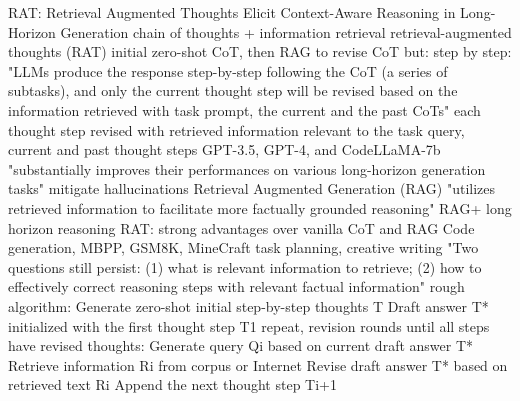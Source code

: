 \documentclass{article}
\begin{document}
\cite{wang_rat_2024} RAT: Retrieval Augmented Thoughts Elicit Context-Aware Reasoning in Long-Horizon Generation
chain of thoughts + information retrieval 
retrieval-augmented thoughts (RAT)
initial zero-shot CoT, then RAG to revise CoT
but: step by step: "LLMs produce the response step-by-step following the CoT (a series of subtasks), and only the current thought step will be revised based on the information retrieved with task prompt, the current and the past CoTs"
each thought step revised with retrieved information relevant to the task query, current and past thought steps
GPT-3.5, GPT-4, and CodeLLaMA-7b
"substantially improves their performances on various long-horizon generation tasks"
mitigate hallucinations
Retrieval Augmented Generation (RAG) "utilizes retrieved information to facilitate more factually grounded reasoning"
RAG+ long horizon reasoning
RAT: strong advantages over vanilla CoT and RAG
Code generation, MBPP, GSM8K, MineCraft task planning, creative writing
"Two questions still persist: (1) what is relevant information to retrieve; (2) how to effectively correct reasoning steps with relevant factual information"
rough algorithm:
Generate zero-shot initial step-by-step thoughts T
Draft answer T* initialized with the first thought step T1
repeat, revision rounds until all steps have revised thoughts:
Generate query Qi based on current draft answer T*
Retrieve information Ri from corpus or Internet
Revise draft answer T* based on retrieved text Ri
Append the next thought step Ti+1
\end{document}
